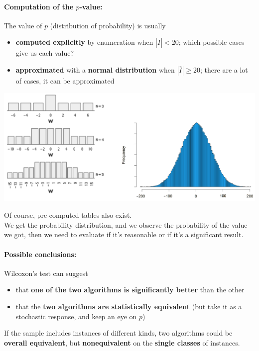 \newpage

\paragraph{Computation of the $p$-value:} The value of $p$ (distribution of probability) is usually
\begin{itemize}
	\item \textbf{computed explicitly} by enumeration when $|\overline{I}| < 20$; which possible cases give us each value?
	\item \textbf{approximated} with a \textbf{normal distribution} when $|\overline{I}| \geq 20$; there are a lot of cases, it can be approximated
\end{itemize}
\begin{center}
	\includegraphics[width=\columnwidth]{img/pval1}
\end{center}
Of course, pre-computed tables also exist.\\

We get the probability distribution, and we observe the probability of the value we got, then we need to evaluate if it's reasonable or if it's a significant result. \\

\newpage

\paragraph{Possible conclusions:} Wilcoxon's test can suggest
\begin{itemize}
	\item that \textbf{one of the two algorithms is significantly better} than the other
	\item that the \textbf{two algorithms are statistically equivalent} (but take it as a stochastic response, and keep an eye on $p$)
\end{itemize}

If the sample includes instances of different kinds, two algorithms could be \textbf{overall equivalent}, but \textbf{nonequivalent} on the \textbf{single classes} of instances.\\

